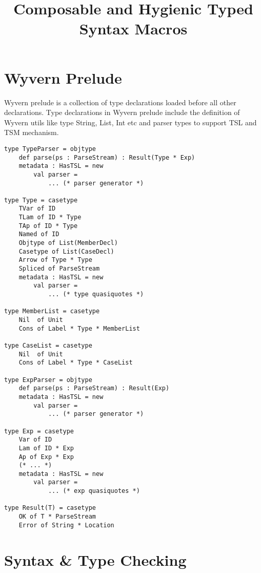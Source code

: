\documentclass[letterpaper, notitlepage]{article}
\begin{document}
\title{Composable and Hygienic Typed Syntax Macros}
\date{}
\maketitle

\section{Wyvern Prelude}
Wyvern prelude is a collection of type declarations loaded before all other declarations. Type declarations in Wyvern prelude include the definition of Wyvern utils like type String, List, Int etc and parser types to support TSL and TSM mechanism.  
\begin{lstlisting}[style=wyvern]
type TypeParser = objtype
	def parse(ps : ParseStream) : Result(Type * Exp)
	metadata : HasTSL = new 
		val parser = 
			... (* parser generator *)

type Type = casetype
	TVar of ID
	TLam of ID * Type
	TAp of ID * Type
	Named of ID
	Objtype of List(MemberDecl)
	Casetype of List(CaseDecl)
	Arrow of Type * Type
	Spliced of ParseStream
	metadata : HasTSL = new
		val parser = 
			... (* type quasiquotes *)

type MemberList = casetype
	Nil  of Unit
	Cons of Label * Type * MemberList

type CaseList = casetype
	Nil  of Unit
	Cons of Label * Type * CaseList

type ExpParser = objtype
	def parse(ps : ParseStream) : Result(Exp)
	metadata : HasTSL = new 
		val parser = 
			... (* parser generator *)

type Exp = casetype
	Var of ID
	Lam of ID * Exp
	Ap of Exp * Exp
	(* ... *)
	metadata : HasTSL = new
		val parser = 
			... (* exp quasiquotes *)

type Result(T) = casetype
	OK of T * ParseStream
	Error of String * Location
\end{lstlisting}

\section{Syntax \& Type Checking}
\end{document}
